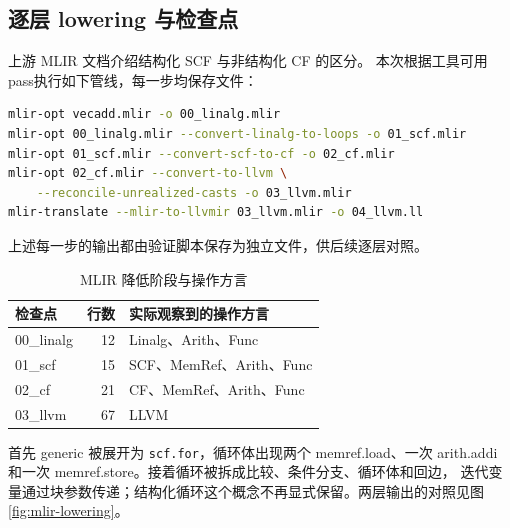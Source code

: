\subsection{逐层 lowering 与检查点}
上游 MLIR 文档介绍结构化 SCF 与非结构化 CF 的区分。
本次根据工具可用 pass执行如下管线，每一步均保存文件：
\par\vspace{0.7\baselineskip}\noindent\begin{minipage}[t]{\linewidth}
\begin{lstlisting}[language=bash]
mlir-opt vecadd.mlir -o 00_linalg.mlir
mlir-opt 00_linalg.mlir --convert-linalg-to-loops -o 01_scf.mlir
mlir-opt 01_scf.mlir --convert-scf-to-cf -o 02_cf.mlir
mlir-opt 02_cf.mlir --convert-to-llvm \
    --reconcile-unrealized-casts -o 03_llvm.mlir
mlir-translate --mlir-to-llvmir 03_llvm.mlir -o 04_llvm.ll
\end{lstlisting}
\end{minipage}\par\vspace{0.5\baselineskip}

上述每一步的输出都由验证脚本保存为独立文件，供后续逐层对照。

\begin{table}[htbp]
\centering\small
\caption{MLIR 降低阶段与操作方言}
\begin{tabular}{lrl}
\toprule
检查点 & 行数 & 实际观察到的操作方言\\
\midrule
00\_linalg & 12 & Linalg、Arith、Func\\
01\_scf & 15 & SCF、MemRef、Arith、Func\\
02\_cf & 21 & CF、MemRef、Arith、Func\\
03\_llvm & 67 & LLVM\\
\bottomrule
\end{tabular}
\end{table}

首先 generic 被展开为 \texttt{scf.for}，循环体出现两个 memref.load、一次
arith.addi 和一次 memref.store。接着循环被拆成比较、条件分支、循环体和回边，
迭代变量通过块参数传递；结构化循环这个概念不再显式保留。两层输出的对照见图\ref{fig:mlir-lowering}。


